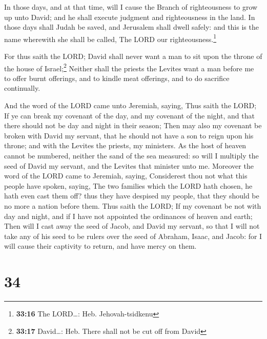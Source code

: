  In those days, and at that time, will I cause the Branch
of righteousness to grow up unto David; and he shall execute judgment
and righteousness in the land.  In those days shall Judah
be saved, and Jerusalem shall dwell safely: and this is the name
wherewith she shall be called, The LORD our righteousness.\footnote{\textbf{33:16}
  The LORD\ldots: Heb. Jehovah-tsidkenu}

 For thus saith the LORD; David shall never want a man to
sit upon the throne of the house of Israel;\footnote{\textbf{33:17}
  David\ldots: Heb. There shall not be cut off from David}
 Neither shall the priests the Levites want a man before
me to offer burnt offerings, and to kindle meat offerings, and to do
sacrifice continually.

 And the word of the LORD came unto Jeremiah, saying,
 Thus saith the LORD; If ye can break my covenant of the
day, and my covenant of the night, and that there should not be day and
night in their season;  Then may also my covenant be
broken with David my servant, that he should not have a son to reign
upon his throne; and with the Levites the priests, my ministers.
 As the host of heaven cannot be numbered, neither the
sand of the sea measured: so will I multiply the seed of David my
servant, and the Levites that minister unto me.  Moreover
the word of the LORD came to Jeremiah, saying, 
Considerest thou not what this people have spoken, saying, The two
families which the LORD hath chosen, he hath even cast them off? thus
they have despised my people, that they should be no more a nation
before them.  Thus saith the LORD; If my covenant be not
with day and night, and if I have not appointed the ordinances of heaven
and earth;  Then will I cast away the seed of Jacob, and
David my servant, so that I will not take any of his seed to be rulers
over the seed of Abraham, Isaac, and Jacob: for I will cause their
captivity to return, and have mercy on them.

\hypertarget{section-33}{%
\section{34}\label{section-33}}

